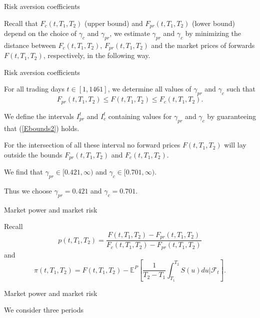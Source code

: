{Risk aversion coefficients}

Recall that $F_c(t,T_1,T_2)$ (upper bound) and
$F_{pr}(t,T_1,T_2)$ (lower bound) depend on the choice of
$\gamma_{c}$ and $\gamma_{pr}$, we estimate $\gamma_{pr}$ and
$\gamma_{c}$ by minimizing the distance between $F_c(t,T_1,T_2)$,
$F_{pr}(t,T_1,T_2)$ and the market prices of forwards
$F(t,T_1,T_2)$, respectively, in the following way.

{Risk aversion coefficients}







	For all trading days $t\in[1,1461]$,  we determine all values of $\gamma_{pr}$ and $\gamma_c$
such that
\begin{equation}\label{Ebounds2}
F_{pr}(t,T_1,T_2)\leq F(t,T_1,T_2)\leq F_c(t,T_1,T_2).
\end{equation}


	
We define the intervals
$I_{pr}^t$ and $I_{c}^t$ containing values for $\gamma_{pr}$ and
$\gamma_{c}$ by guaranteeing that (\ref{Ebounds2}) holds.


	
For the intersection of all these interval no forward prices $F(t,T_1,T_2)$ will
lay outside the bounds $F_{pr}(t,T_1,T_2)$ and $F_{c}(t,T_1,T_2)$.


	
We find that $\gamma_{pr}\in  [0.421,\infty)$
and $\gamma_{c}\in [0.701,\infty)$.


	
Thus we choose $\gamma_{pr}=0.421$ and $\gamma_{c}=0.701$.





{Market power and market risk }

Recall
\[p(t,T_1,T_2)=\frac{F(t,T_1,T_2)-F_{pr}(t,T_1,T_2)}{F_c(t,T_1,T_2)-F_{pr}(t,T_1,T_2)}\]
 and
 \[\pi(t,T_1,T_2)=F(t,T_1,T_2)-\mathbb{E}^{P}\left[\frac{1}{T_2-T_1}\int_{T_1}^{T_2}S(u)du|\mathcal{F}_t\right].\]

{Market power and market risk }

We consider three periods


